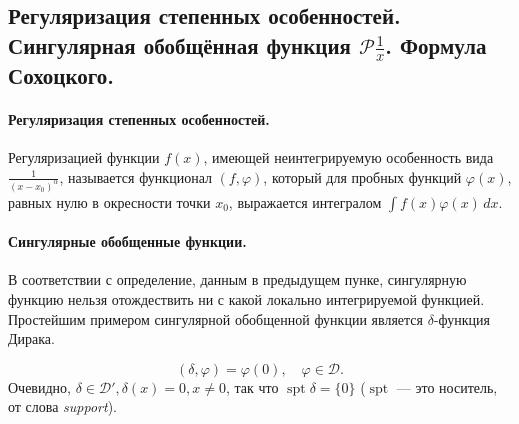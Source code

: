 \subsection{Регуляризация степенных особенностей. Сингулярная обобщённая функция $\mathcal{P} \frac{1}{x}$. Формула Сохоцкого.}


\paragraph{Регуляризация степенных особенностей.} Регуляризацией функции $f(x)$, имеющей неинтегрируемую особенность вида $\frac{1}{(x - x_0)^{\alpha}}$, называется функционал $(f, \varphi)$, который для пробных функций $\varphi(x)$, равных нулю в окресности точки $x_0$, выражается интегралом $\int f(x) \varphi(x) \, dx$.

\paragraph{Сингулярные обобщенные функции.}

В соответствии с определение, данным в предыдущем пунке, сингулярную функцию нельзя отождествить ни с какой локально интегрируемой функцией. Простейшим примером сингулярной обобщенной функции является $\delta$-функция Дирака.

\begin{equation}
	(\delta, \varphi) = \varphi(0), \quad \varphi \in \mathcal{D}.
\end{equation}
Очевидно, $\delta \in \mathcal{D}', \delta(x) = 0, x \not = 0$, так что $\operatorname{spt}{\delta} = \{0\}$ ($\operatorname{spt}$ --- это носитель, от слова \textit{support}).
 



